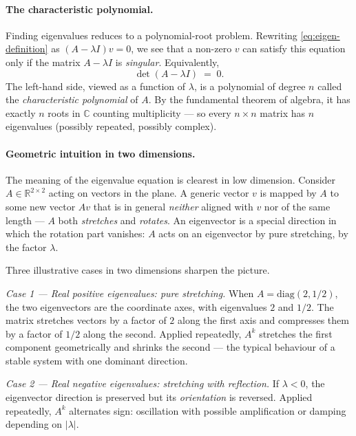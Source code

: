 \documentclass[11pt, a4paper, oneside]{article}
\begin{document}
\paragraph{The characteristic polynomial.}
Finding eigenvalues reduces to a polynomial-root problem. Rewriting
\eqref{eq:eigen-definition} as $(A - \lambda I) v = 0$, we see that a
non-zero $v$ can satisfy this equation only if the matrix
$A - \lambda I$ is \emph{singular}. Equivalently,
\begin{equation}
\det(A - \lambda I) \;=\; 0.
\label{eq:characteristic-poly}
\end{equation}
The left-hand side, viewed as a function of $\lambda$, is a polynomial
of degree $n$ called the \emph{characteristic polynomial} of $A$. By
the fundamental theorem of algebra, it has exactly $n$ roots in
$\mathbb{C}$ counting multiplicity — so every $n \times n$ matrix has
$n$ eigenvalues (possibly repeated, possibly complex).

\paragraph{Geometric intuition in two dimensions.}
The meaning of the eigenvalue equation is clearest in low dimension.
Consider $A \in \mathbb{R}^{2 \times 2}$ acting on vectors in the
plane. A generic vector $v$ is mapped by $A$ to some new vector $Av$
that is in general \emph{neither} aligned with $v$ nor of the same
length — $A$ both \emph{stretches} and \emph{rotates}. An eigenvector
is a special direction in which the rotation part vanishes: $A$ acts
on an eigenvector by pure stretching, by the factor $\lambda$.

Three illustrative cases in two dimensions sharpen the picture.

\emph{Case 1 — Real positive eigenvalues: pure stretching.} When
$A = \mathrm{diag}(2, 1/2)$, the two eigenvectors are the coordinate
axes, with eigenvalues $2$ and $1/2$. The matrix stretches vectors by
a factor of $2$ along the first axis and compresses them by a factor
of $1/2$ along the second. Applied repeatedly, $A^k$ stretches the
first component geometrically and shrinks the second — the typical
behaviour of a stable system with one dominant direction.

\emph{Case 2 — Real negative eigenvalues: stretching with reflection.}
If $\lambda < 0$, the eigenvector direction is preserved but its
\emph{orientation} is reversed. Applied repeatedly, $A^k$ alternates
sign: oscillation with possible amplification or damping depending on
$|\lambda|$.
\end{document}
